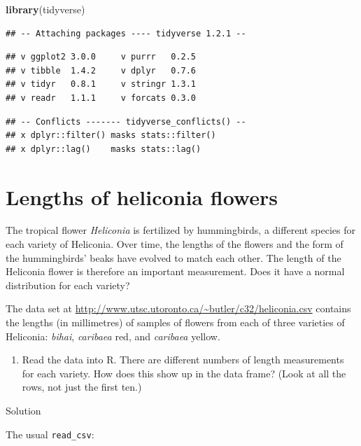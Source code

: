 \documentclass[]{tufte-book}
\newenvironment{Shaded}{}{}
\newcommand{\KeywordTok}[1]{\textcolor[rgb]{0.00,0.44,0.13}{\textbf{#1}}}
\newcommand{\NormalTok}[1]{#1}
\providecommand{\tightlist}{%
  \setlength{\itemsep}{0pt}\setlength{\parskip}{0pt}}
\theoremstyle{definition}
\theoremstyle{definition}
\theoremstyle{definition}
\theoremstyle{remark}
\begin{document}
\begin{Shaded}
\begin{Highlighting}[]
\KeywordTok{library}\NormalTok{(tidyverse)}
\end{Highlighting}
\end{Shaded}

\begin{verbatim}
## -- Attaching packages ---- tidyverse 1.2.1 --
\end{verbatim}

\begin{verbatim}
## v ggplot2 3.0.0     v purrr   0.2.5
## v tibble  1.4.2     v dplyr   0.7.6
## v tidyr   0.8.1     v stringr 1.3.1
## v readr   1.1.1     v forcats 0.3.0
\end{verbatim}

\begin{verbatim}
## -- Conflicts ------- tidyverse_conflicts() --
## x dplyr::filter() masks stats::filter()
## x dplyr::lag()    masks stats::lag()
\end{verbatim}

\hypertarget{lengths-of-heliconia-flowers}{%
\section{Lengths of heliconia
flowers}\label{lengths-of-heliconia-flowers}}

The tropical flower \emph{Heliconia} is fertilized by hummingbirds, a
different species for each variety of Heliconia. Over time, the lengths
of the flowers and the form of the hummingbirds' beaks have evolved to
match each other. The length of the Heliconia flower is therefore an
important measurement. Does it have a normal distribution for each
variety?

The data set at
\url{http://www.utsc.utoronto.ca/~butler/c32/heliconia.csv} contains the
lengths (in millimetres) of samples of flowers from each of three
varieties of Heliconia: \emph{bihai}, \emph{caribaea} red, and
\emph{caribaea} yellow.

\begin{enumerate}
\def\labelenumi{(\alph{enumi})}
\tightlist
\item
  Read the data into R. There are different numbers of length
  measurements for each variety. How does this show up in the data
  frame? (Look at all the rows, not just the first ten.)
\end{enumerate}

Solution

The usual \texttt{read\_csv}:
\end{document}
